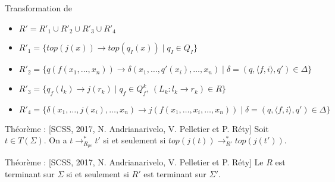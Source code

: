 \begin{frame}{\pctrs}
\begin{example}
\begin{columns}
\begin{column}{0.5\textwidth}
\begin{overprint}
        \end{overprint}
      \end{column}
    \end{columns}
  \end{example}
\end{frame}

\begin{frame}{Transformation de \pctrs}
  \begin{itemize}
  \item $R' = R'_1 \cup R'_2 \cup R'_3 \cup R'_4$
  \item $R'_1 = \{top(j(x)) \rightarrow top(q_I(x)) \mid q_I \in Q_I\}$
  \item $R'_2= \{q(f(x_1,\ldots,x_n))\rightarrow \delta(x_1,\ldots,q'(x_i),\ldots,x_n) \mid \delta=(q, \langle f,i \rangle, q') \in \Delta\}$
  \item $R'_3= \{q_f(l_k) \rightarrow j(r_k) \mid q_f \in Q_f^k,\, (L_k : l_k \rightarrow r_k) \in R\}$
  \item $R'_4= \{\delta(x_1,\ldots,j(x_i),\ldots,x_n)\rightarrow j(f(x_1,\ldots,x_i,\ldots,x_n)) \mid \delta=(q, \langle f,i \rangle, q') \in \Delta\}$
  \end{itemize}
  \begin{alertblock}{Théorème : {\small[SCSS, 2017, N. Andrianarivelo, V. Pelletier et P. Réty]}}
    Soit $t \in T(\Sigma)$. On a $t \rightarrow^*_{R_{pc}} t'$ si et seulement si $top(j(t)) \rightarrow^*_{R'} top(j(t'))$.
  \end{alertblock}
  \begin{alertblock}{Théorème : {\small[SCSS, 2017, N. Andrianarivelo, V. Pelletier et P. Réty]}}
    Le \pctrs $R$ est terminant sur $\Sigma$ si et seulement si $R'$ est terminant sur $\Sigma'$.
  \end{alertblock}
\end{frame}

